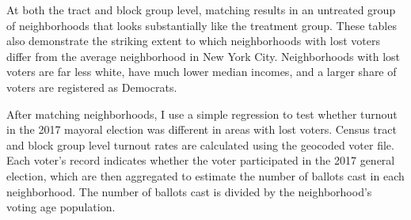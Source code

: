 \documentclass[]{article}
\begin{document}
\begin{table}[H]

\caption{\label{tab:tract-table-chunk}\label{tab:tract-table} Results of Tract-Level Matching}
\centering
{}
\end{table}

At both the tract and block group level, matching results in an untreated group of neighborhoods that looks substantially like the treatment group. These tables also demonstrate the striking extent to which neighborhoods with lost voters differ from the average neighborhood in New York City. Neighborhoods with lost voters are far less white, have much lower median incomes, and a larger share of voters are registered as Democrats.

After matching neighborhoods, I use a simple regression to test whether turnout in the 2017 mayoral election was different in areas with lost voters. Census tract and block group level turnout rates are calculated using the geocoded voter file. Each voter's record indicates whether the voter participated in the 2017 general election, which are then aggregated to estimate the number of ballots cast in each neighborhood. The number of ballots cast is divided by the neighborhood's voting age population.
\end{document}
